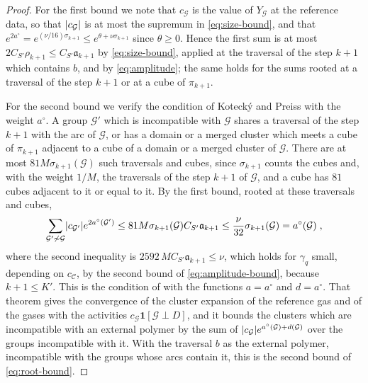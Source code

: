 \documentclass[11pt]{preprint}
\DeclarePairedDelimiter{\abs}{\lvert}{\rvert}
\numberwithin{equation}{section}
\theoremstyle{definition}
\theoremstyle{remark}
\theoremstyle{plain}
\begin{document}
\begin{proof}
For the first bound we note that $c_{\mathcal G}$ is the value of $Y_{\mathcal G}$ at the reference data, so that $\abs{c_{\mathcal G}}$ is at most the supremum in \eqref{eq:size-bound}, and that $e^{2a^\circ} = e^{(\nu/16)\sigma_{k+1}} \leq e^{\theta + \nu\sigma_{k+1}}$ since $\theta \geq 0$. Hence the first sum is at most $2C_{S'}\rho_{k+1} \leq C_{S'}\mathfrak a_{k+1}$ by \eqref{eq:size-bound}, applied at the traversal of the step $k + 1$ which contains $b$, and by \eqref{eq:amplitude}; the same holds for the sums rooted at a traversal of the step $k + 1$ or at a cube of $\pi_{k+1}$.

For the second bound we verify the condition of Koteck\'y and Preiss with the weight $a^\circ$. A group $\mathcal G'$ which is incompatible with $\mathcal G$ shares a traversal of the step $k + 1$ with the arc of $\mathcal G$, or has a domain or a merged cluster which meets a cube of $\pi_{k+1}$ adjacent to a cube of a domain or a merged cluster of $\mathcal G$. There are at most $81M\sigma_{k+1}(\mathcal G)$ such traversals and cubes, since $\sigma_{k+1}$ counts the cubes and, with the weight $1/M$, the traversals of the step $k + 1$ of $\mathcal G$, and a cube has $81$ cubes adjacent to it or equal to it. By the first bound, rooted at these traversals and cubes,
\begin{equation}\label{eq:kp-condition}
    \sum_{\mathcal G' \not\sim \mathcal G}\abs{c_{\mathcal G'}}e^{2a^\circ(\mathcal G')} \leq 81M\sigma_{k+1}(\mathcal G)C_{S'}\mathfrak a_{k+1} \leq \frac{\nu}{32}\sigma_{k+1}(\mathcal G) = a^\circ(\mathcal G)\;,
\end{equation}
where the second inequality is $2592\,MC_{S'}\mathfrak a_{k+1} \leq \nu$, which holds for $\gamma_q$ small, depending on $c_{\mathcal C}$, by the second bound of \eqref{eq:amplitude-bound}, because $k + 1 \leq K'$. This is the condition of \cite[Theorem~5.4]{FriedliVelenik} with the functions $a = a^\circ$ and $d = a^\circ$. That theorem gives the convergence of the cluster expansion of the reference gas and of the gases with the activities $c_{\mathcal G}\mathbf 1[\mathcal G \perp D]$, and it bounds the clusters which are incompatible with an external polymer by the sum of $\abs{c_{\mathcal G}}e^{a^\circ(\mathcal G) + d(\mathcal G)}$ over the groups incompatible with it. With the traversal $b$ as the external polymer, incompatible with the groups whose arcs contain it, this is the second bound of \eqref{eq:root-bound}.


\end{proof}
\end{document}
